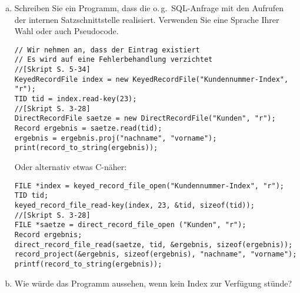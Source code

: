 \begin{enumerate}[a)]
	\item Schreiben Sie ein Programm, dass die o.\,g.\ SQL-Anfrage mit den Aufrufen der internen Satzschnittstelle realisiert. Verwenden Sie eine Sprache Ihrer Wahl oder auch Pseudocode.

	\begin{solution}
	\texttt{// Wir nehmen an, dass der Eintrag existiert\\
		// Es wird auf eine Fehlerbehandlung verzichtet\\
		//[Skript S. 5-34] \\
		KeyedRecordFile index = new KeyedRecordFile("Kundennummer-Index", "r"); \\
		TID tid = index.read-key(23); \\
		//[Skript S. 3-28] \\
		DirectRecordFile saetze = new DirectRecordFile("Kunden", "r"); \\
		Record ergebnis = saetze.read(tid); \\
		ergebnis = ergebnis.proj("nachname", "vorname"); \\
		print(record\_to\_string(ergebnis));}

	Oder alternativ etwas C-näher:

	\texttt{FILE *index = keyed\_record\_file\_open("Kundennummer-Index", "r"); \\
		TID tid; \\
		keyed\_record\_file\_read-key(index, 23, \&tid, sizeof(tid)); \\
		//[Skript S. 3-28] \\
		FILE *saetze = direct\_record\_file\_open ("Kunden", "r"); \\
		Record ergebnis; \\
		direct\_record\_file\_read(saetze, tid, \&ergebnis, sizeof(ergebnis)); \\
		record\_project(\&ergebnis, sizeof(ergebnis), "nachname", "vorname"); \\
		printf(record\_to\_string(ergebnis));}
	\end{solution}

	\item Wie würde das Programm aussehen, wenn kein Index zur Verfügung stünde?


\end{enumerate}

